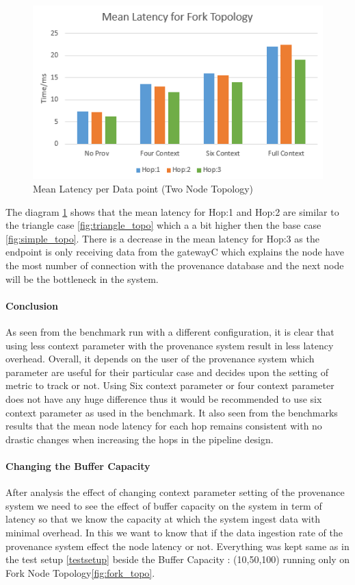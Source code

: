 \begin{figure}[H]
	\center
	\includegraphics[width=\textwidth]{figures/ForkTopology_latency.PNG}
	\caption{Mean Latency per Data point  (Two Node Topology)}
	\label{fig:forktopo_latency}
\end{figure}

The diagram \ref{fig:forktopo_latency} shows that the mean latency for Hop:1 and Hop:2 are similar to the triangle case \ref{fig:triangle_topo} which a a bit higher then the base case \ref{fig:simple_topo}. There is a decrease in the mean latency for Hop:3 as the endpoint is only receiving data from the gatewayC which explains the node have the most number of connection with the provenance database and the next node will be the bottleneck in the system. 

\paragraph*{Conclusion}
As seen from the benchmark run with a different configuration, it is clear that using less context parameter with the provenance system result in less latency overhead. Overall, it depends on the user of the provenance system which parameter are useful for their particular case and decides upon the setting of metric to track or not. Using Six context parameter or four context parameter does not have any huge difference thus it would be recommended to use six context parameter as used in the benchmark. It also seen from the benchmarks results that the mean node latency for each hop remains consistent with no drastic changes when increasing the hops in the pipeline design.


\pagebreak
\paragraph*{Changing the Buffer Capacity}
After analysis the effect of changing context parameter setting of the provenance system we need to see the effect of buffer capacity on the system in term of latency so that we know the capacity at which the system ingest data with minimal overhead. In this we want to know that if the data ingestion rate of the provenance system effect the node latency or not.
Everything was kept same as in the test setup \ref{testsetup} beside the Buffer Capacity : (10,50,100) running only on Fork Node Topology\ref{fig:fork_topo}.

